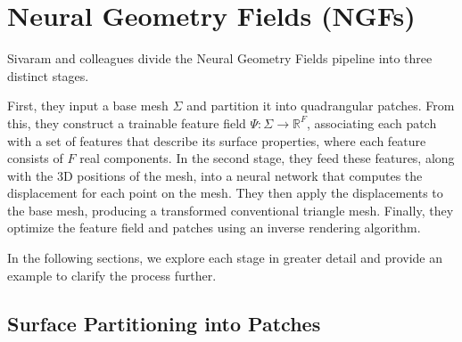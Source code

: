 \section{Neural Geometry Fields (NGFs)}\label{Sec:MainPart}

Sivaram and colleagues divide the Neural Geometry Fields pipeline into three distinct stages.

First, they input a base mesh \( \Sigma \) and partition it into quadrangular patches.
From this, they construct a trainable feature field \( \Psi : \Sigma \to \mathbb{R}^F \), associating each patch with a set of features that describe its surface properties, where each feature consists of \( F \) real components.
In the second stage, they feed these features, along with the 3D positions of the mesh, into a neural network that computes the displacement for each point on the mesh.
They then apply the displacements to the base mesh, producing a transformed conventional triangle mesh.
Finally, they optimize the feature field and patches using an inverse rendering algorithm.

In the following sections, we explore each stage in greater detail and provide an example to clarify the process further.






\subsection{Surface Partitioning into Patches}

